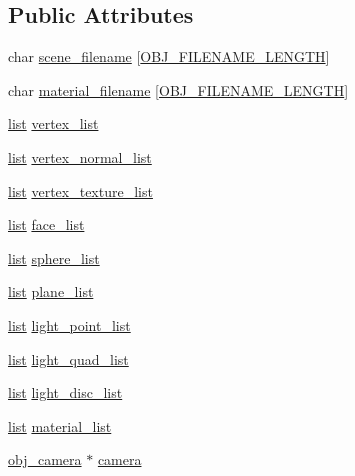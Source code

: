 \subsection*{Public Attributes}
\begin{DoxyCompactItemize}
\item 
char \hyperlink{structobj__growable__scene__data_ab11f689f063e184661781e94da0ccce1}{scene\+\_\+filename} \mbox{[}\hyperlink{obj__parser_8h_a75e6857d3610a75bc56591ab64210fc0}{O\+B\+J\+\_\+\+F\+I\+L\+E\+N\+A\+M\+E\+\_\+\+L\+E\+N\+G\+T\+H}\mbox{]}
\item 
char \hyperlink{structobj__growable__scene__data_a2b760bb727ab7b49bb9971fb3e6ed3a8}{material\+\_\+filename} \mbox{[}\hyperlink{obj__parser_8h_a75e6857d3610a75bc56591ab64210fc0}{O\+B\+J\+\_\+\+F\+I\+L\+E\+N\+A\+M\+E\+\_\+\+L\+E\+N\+G\+T\+H}\mbox{]}
\item 
\hyperlink{structlist}{list} \hyperlink{structobj__growable__scene__data_a13975a6dbaa62718add1043de08324d8}{vertex\+\_\+list}
\item 
\hyperlink{structlist}{list} \hyperlink{structobj__growable__scene__data_a8434f1f1123eaf06a4e87f7a4c157527}{vertex\+\_\+normal\+\_\+list}
\item 
\hyperlink{structlist}{list} \hyperlink{structobj__growable__scene__data_a85ee455560d2f8c8910257bb4b96c5bf}{vertex\+\_\+texture\+\_\+list}
\item 
\hyperlink{structlist}{list} \hyperlink{structobj__growable__scene__data_a371039f614baf3b51c079d577ed8247a}{face\+\_\+list}
\item 
\hyperlink{structlist}{list} \hyperlink{structobj__growable__scene__data_a5c49ed985e0f8bddf535807b840618f3}{sphere\+\_\+list}
\item 
\hyperlink{structlist}{list} \hyperlink{structobj__growable__scene__data_aea6999082b6a4000f5753ab81e30806b}{plane\+\_\+list}
\item 
\hyperlink{structlist}{list} \hyperlink{structobj__growable__scene__data_a78cb39927508e8622f328756a954c50d}{light\+\_\+point\+\_\+list}
\item 
\hyperlink{structlist}{list} \hyperlink{structobj__growable__scene__data_a64d1574b4bae19b123e8cb3f6688555f}{light\+\_\+quad\+\_\+list}
\item 
\hyperlink{structlist}{list} \hyperlink{structobj__growable__scene__data_a774c6e71151e61488452babc59db667c}{light\+\_\+disc\+\_\+list}
\item 
\hyperlink{structlist}{list} \hyperlink{structobj__growable__scene__data_ad271be9b71b2dfd6fbadd5bf69e74bf5}{material\+\_\+list}
\item 
\hyperlink{structobj__camera}{obj\+\_\+camera} $\ast$ \hyperlink{structobj__growable__scene__data_a44df213a8051ff348dbeba280ee7112c}{camera}
\end{DoxyCompactItemize}


